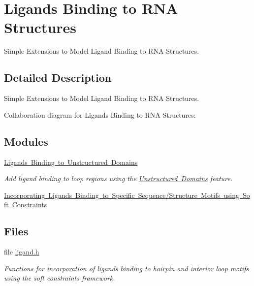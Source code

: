 \hypertarget{group__ligand__binding}{}\section{Ligands Binding to R\+NA Structures}
\label{group__ligand__binding}


Simple Extensions to Model Ligand Binding to R\+NA Structures.  




\subsection{Detailed Description}
Simple Extensions to Model Ligand Binding to R\+NA Structures. 

Collaboration diagram for Ligands Binding to R\+NA Structures\+:
\subsection*{Modules}
\begin{DoxyCompactItemize}
\item 
\mbox{\hyperlink{group__ligands__up}{Ligands Binding to Unstructured Domains}}
\begin{DoxyCompactList}\small\item\em Add ligand binding to loop regions using the \mbox{\hyperlink{group__domains__up}{Unstructured Domains}} feature. \end{DoxyCompactList}\item 
\mbox{\hyperlink{group__constraints__ligand}{Incorporating Ligands Binding to Specific Sequence/\+Structure Motifs using Soft Constraints}}
\end{DoxyCompactItemize}
\subsection*{Files}
\begin{DoxyCompactItemize}
\item 
file \mbox{\hyperlink{ligand_8h}{ligand.\+h}}
\begin{DoxyCompactList}\small\item\em Functions for incorporation of ligands binding to hairpin and interior loop motifs using the soft constraints framework. \end{DoxyCompactList}\end{DoxyCompactItemize}
